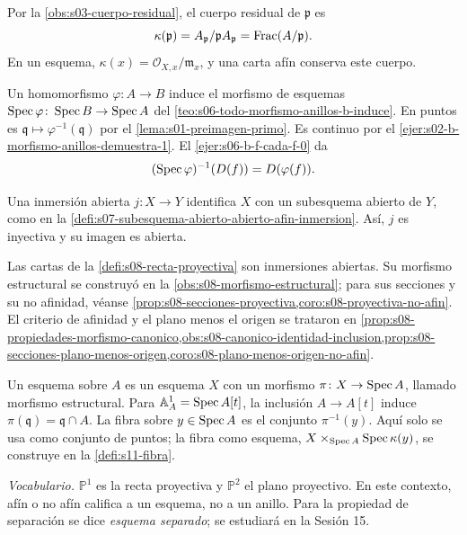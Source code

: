 Por la \cref{obs:s03-cuerpo-residual}, el cuerpo residual de $\mathfrak p$ es
\[
\kappa(\mathfrak p)=A_{\mathfrak p}/\mathfrak pA_{\mathfrak p}=\operatorname{Frac}(A/\mathfrak p).
\]
En un esquema, $\kappa(x)=\mathcal O_{X,x}/\mathfrak m_x$, y una carta afín conserva este cuerpo.

\begin{defi}
\label{defi:s08-morfismo-inducido-homomorfismo}
Un homomorfismo $\varphi\colon A\to B$ induce el morfismo de esquemas $\operatorname{Spec}\varphi\colon\operatorname{Spec} B\to\operatorname{Spec} A$ del \cref{teo:s06-todo-morfismo-anillos-b-induce}. En puntos es $\mathfrak q\mapsto\varphi^{-1}(\mathfrak q)$ por el \cref{lema:s01-preimagen-primo}. Es continuo por el \cref{ejer:s02-b-morfismo-anillos-demuestra-1}. El \cref{ejer:s06-b-f-cada-f-0} da
\[
(\operatorname{Spec}\varphi)^{-1}(D(f))=D(\varphi(f)).
\]
\end{defi}

\begin{defi}
\label{defi:s08-inmersion-abierta}
Una inmersión abierta $j\colon X\to Y$ identifica $X$ con un subesquema abierto de $Y$, como en la \cref{defi:s07-subesquema-abierto-abierto-afin-inmersion}. Así, $j$ es inyectiva y su imagen es abierta.
\end{defi}

Las cartas de la \cref{defi:s08-recta-proyectiva} son inmersiones abiertas. Su morfismo estructural se construyó en la \cref{obs:s08-morfismo-estructural}; para sus secciones y su no afinidad, véanse \cref{prop:s08-secciones-proyectiva,coro:s08-proyectiva-no-afin}. El criterio de afinidad y el plano menos el origen se trataron en \cref{prop:s08-propiedades-morfismo-canonico,obs:s08-canonico-identidad-inclusion,prop:s08-secciones-plano-menos-origen,coro:s08-plano-menos-origen-no-afin}.

\begin{defi}
\label{defi:s08-esquema-sobre-anillo-fibra}
Un esquema sobre $A$ es un esquema $X$ con un morfismo $\pi\colon X\to\operatorname{Spec} A$, llamado morfismo estructural. Para $\mathbb A_A^1=\operatorname{Spec} A[t]$, la inclusión $A\to A[t]$ induce $\pi(\mathfrak q)=\mathfrak q\cap A$. La fibra sobre $y\in\operatorname{Spec} A$ es el conjunto $\pi^{-1}(y)$. Aquí solo se usa como conjunto de puntos; la fibra como esquema, $X\times_{\operatorname{Spec} A}\operatorname{Spec}\kappa(y)$, se construye en la \cref{defi:s11-fibra}.
\end{defi}

\emph{Vocabulario.} $\mathbb P^1$ es la recta proyectiva y $\mathbb P^2$ el plano proyectivo. En este contexto, afín o no afín califica a un esquema, no a un anillo. Para la propiedad de separación se dice \emph{esquema separado}; se estudiará en la Sesión 15.

